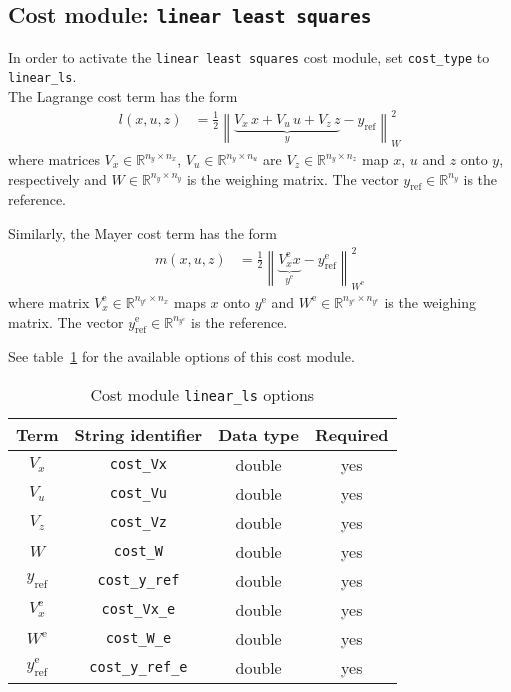 \documentclass[english]{article}
\newcommand{\code}[1]{\texttt{#1}}
\newcommand{\norm}[1]{\left\lVert#1\right\rVert}
\newcommand{\ind}[1]{_{\textrm{#1}}}
\newcommand{\terminal}{^{\textrm{e}}}
\newcommand{\mandatory}{yes}
\begin{document}
\subsection{Cost module: \code{linear least squares}}\label{sec:cost:linear_ls}
%
In order to activate the \code{linear least squares} cost module, set \code{cost\_type} to \code{linear\_ls}.\\
The Lagrange cost term has the form
\begin{align}
l(x, u, z) &= \frac{1}{2} \norm{ \underbrace{V_x\, x + V_u\, u + V_z\, z}_{\displaystyle y} - y\ind{ref}}_W^2 \label{eq:cost:linear_ls:l}
\end{align}
where matrices $ V_x \in \mathbb{R}^{n_y \times n_x}$, $V_u \in \mathbb{R}^{n_y \times n_u}$ are $V_z \in \mathbb{R}^{n_y \times n_z}$ map $x$, $u$ and $z$ onto $y$, respectively and $W \in \mathbb{R}^{n_y \times n_y}$ is the weighing matrix. The vector $y\ind{ref} \in \mathbb{R}^{n_y}$ is the reference.

Similarly, the Mayer cost term has the form
\begin{align}
m(x, u, z) &= \frac{1}{2} \norm{ \underbrace{V_x\terminal x}_{\displaystyle y\terminal} - y\ind{ref}\terminal}_{W\terminal}^2 \label{eq:cost:linear_ls:m}
\end{align}
where matrix $ V\terminal_x \in \mathbb{R}^{n_{y\terminal} \times n_x}$ maps $x$ onto $y\terminal$ and $W\terminal \in \mathbb{R}^{n_{y\terminal} \times n_{y\terminal}}$ is the weighing matrix. The vector $y\terminal_\textrm{ref} \in \mathbb{R}^{n_{y\terminal}}$ is the reference.

See table~\ref{tab:cost:linear_ls} for the available options of this cost module.
%
\begin{table}[ht!]
    \centering
    \caption{Cost module \code{linear\_ls} options} \label{tab:cost:linear_ls}
    \begin{tabular}{cccc}
        \toprule
        Term & String identifier & Data type & Required \\ \midrule
        $ V_x $ & \code{cost\_Vx}    & double & \mandatory   \\
        $ V_u $ & \code{cost\_Vu}    & double & \mandatory   \\
        $ V_z $ & \code{cost\_Vz}    & double & \mandatory  \\
        $ W $ & \code{cost\_W}    & double & \mandatory  \\
        $ y\ind{ref} $ & \code{cost\_y\_ref}    & double & \mandatory   \\ [1em]
        $ V_x\terminal $ & \code{cost\_Vx\_e}    & double  & \mandatory  \\
        $ W\terminal $ & \code{cost\_W\_e}    & double & \mandatory   \\
        $ y\ind{ref}\terminal $ & \code{cost\_y\_ref\_e}   & double & \mandatory   \\
        \bottomrule
    \end{tabular}
\end{table}
%
\end{document}
